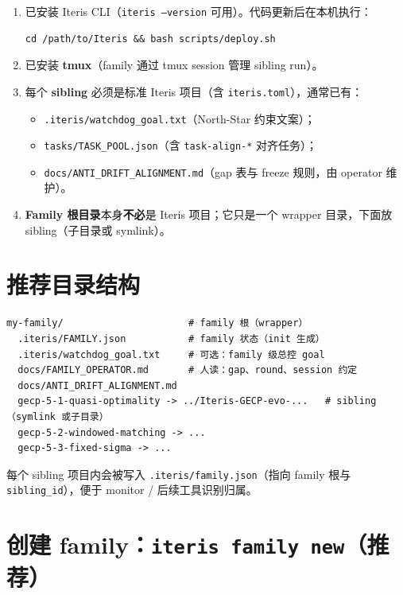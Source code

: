 \documentclass[11pt,a4paper]{ctexart}
\begin{document}
\begin{enumerate}[nosep]
  \item 已安装 Iteris CLI（\texttt{iteris --version} 可用）。代码更新后在本机执行：
    \begin{lstlisting}[style=shell]
cd /path/to/Iteris && bash scripts/deploy.sh
    \end{lstlisting}
  \item 已安装 \textbf{tmux}（family 通过 tmux session 管理 sibling run）。
  \item 每个 \textbf{sibling} 必须是标准 Iteris 项目（含 \texttt{iteris.toml}），通常已有：
    \begin{itemize}[nosep]
      \item \texttt{.iteris/watchdog\_goal.txt}（North-Star 约束文案）；
      \item \texttt{tasks/TASK\_POOL.json}（含 \texttt{task-align-*} 对齐任务）；
      \item \texttt{docs/ANTI\_DRIFT\_ALIGNMENT.md}（gap 表与 freeze 规则，由 operator 维护）。
    \end{itemize}
  \item \textbf{Family 根目录}本身\textbf{不必}是 Iteris 项目；它只是一个 wrapper 目录，下面放 sibling（子目录或 symlink）。
\end{enumerate}

\section{推荐目录结构}

\begin{lstlisting}[style=shell]
my-family/                      # family 根（wrapper）
  .iteris/FAMILY.json           # family 状态（init 生成）
  .iteris/watchdog_goal.txt     # 可选：family 级总控 goal
  docs/FAMILY_OPERATOR.md       # 人读：gap、round、session 约定
  docs/ANTI_DRIFT_ALIGNMENT.md
  gecp-5-1-quasi-optimality -> ../Iteris-GECP-evo-...   # sibling（symlink 或子目录）
  gecp-5-2-windowed-matching -> ...
  gecp-5-3-fixed-sigma -> ...
\end{lstlisting}

每个 sibling 项目内会被写入 \texttt{.iteris/family.json}（指向 family 根与 \texttt{sibling\_id}），便于 monitor / 后续工具识别归属。

\section{创建 family：\texttt{iteris family new}（推荐）}
\end{document}

